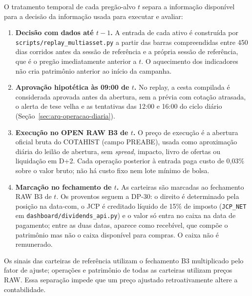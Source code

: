 \documentclass{eic-bcc-tcc}
\begin{document}
O tratamento temporal de cada pregão-alvo $t$ separa a informação disponível para a decisão da informação usada para executar e avaliar:

\begin{enumerate}
  \item \textbf{Decisão com dados até $t-1$.} A entrada de cada ativo é construída por \texttt{scripts/replay\_multiasset.py} a partir das barras compreendidas entre 450 dias corridos antes da sessão de referência e a própria sessão de referência, que é o pregão imediatamente anterior a $t$. O aquecimento dos indicadores não cria patrimônio anterior ao início da campanha.
  \item \textbf{Aprovação hipotética às 09:00 de $t$.} No replay, a cesta compilada é considerada aprovada antes da abertura, sem a prévia com cotação atrasada, o alerta de tese velha e as tentativas das 12:00 e 16:00 do ciclo diário (Seção~\ref{sec:arq-operacao-diaria}).
  \item \textbf{Execução no OPEN RAW B3 de $t$.} O preço de execução é a abertura oficial bruta do COTAHIST (campo PREABE), usada como aproximação diária do leilão de abertura, sem \textit{spread}, impacto, livro de ofertas ou liquidação em D+2. Cada operação posterior à entrada paga custo de 0,03\% sobre o valor bruto; não há custo fixo nem lote mínimo de bolsa.
  \item \textbf{Marcação no fechamento de $t$.} As carteiras são marcadas ao fechamento RAW B3 de $t$. Os proventos seguem a DP-30: o direito é determinado pela posição na data-com, o JCP é creditado líquido de 15\% de imposto (\texttt{JCP\_NET} em \texttt{dashboard/dividends\_api.py}) e o valor só entra no caixa na data de pagamento; entre as duas datas, aparece como recebível, que compõe o patrimônio mas não o caixa disponível para compras. O caixa não é remunerado.
\end{enumerate}

Os sinais das carteiras de referência utilizam o fechamento B3 multiplicado pelo fator de ajuste; operações e patrimônio de todas as carteiras utilizam preços RAW. Essa separação impede que um preço ajustado retroativamente altere a contabilidade.
\end{document}
